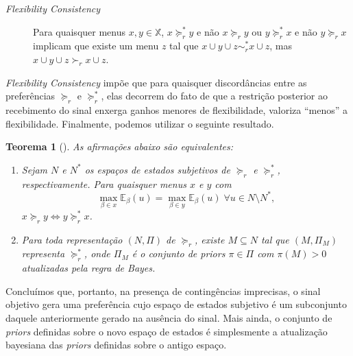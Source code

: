 \documentclass[12pt, a4paper]{article}
\theoremstyle{nonumberplain}
\theoremstyle{plain}
\newtheorem{theorem}{Teorema}
\theoremstyle{plain}
\theoremstyle{plain}
\theoremstyle{nonumberplain}
\begin{document}
\begin{description}
\item[\emph{Flexibility Consistency} \citep{Moura2013}] Para quaisquer menus $x,y\in \mathbb{X}$, $x\succcurlyeq^*_r y$ e não $x\succcurlyeq_r y$ ou $y\succcurlyeq^*_r x$ e não $y\succcurlyeq_r x$ implicam que existe um menu $z$ tal que $x\cup y\cup z \sim^*_r x\cup z$, mas $x\cup y\cup z \succ_r x\cup z$.
\end{description}

\emph{Flexibility Consistency} impõe que para quaisquer discordâncias entre as preferências $\succcurlyeq_r$ e $\succcurlyeq^*_r$, elas decorrem do fato de que a restrição posterior ao recebimento do sinal enxerga ganhos menores de flexibilidade, valoriza ``menos'' a flexibilidade. Finalmente, podemos utilizar o seguinte resultado.

\begin{theorem}[\cite{Moura2013}]
As afirmações abaixo são equivalentes:
\begin{enumerate}[1.]
\item Sejam $N$ e $N^*$ os espaços de estados subjetivos de $\succcurlyeq_r$ e $\succcurlyeq^*_r$, respectivamente. Para quaisquer menus $x$ e $y$ com 
$$\max_{\beta\in x}\mathbb{E}_\beta(u) = \max_{\beta\in y}\mathbb{E}_\beta(u)\;\forall u\in N\setminus N^*,$$
$x\succcurlyeq_r y \Leftrightarrow y\succcurlyeq^*_r x$.
\item Para toda representação $(N,\Pi)$ de $\succcurlyeq_r$, existe $M\subseteq N$ tal que $(M,\Pi_M)$ representa $\succcurlyeq_r^*$, onde $\Pi_M$ é o conjunto de \emph{priors} $\pi\in \Pi$ com $\pi(M)>0$ atualizadas pela regra de Bayes.
\end{enumerate}
\end{theorem}       

Concluímos que, portanto, na presença de contingências imprecisas, o sinal objetivo gera uma preferência cujo espaço de estados subjetivo é um subconjunto daquele anteriormente gerado na ausência do sinal. Mais ainda, o conjunto de \emph{priors} definidas sobre o novo espaço de estados é simplesmente a atualização bayesiana das \emph{priors} definidas sobre o antigo espaço.  
\end{document}

